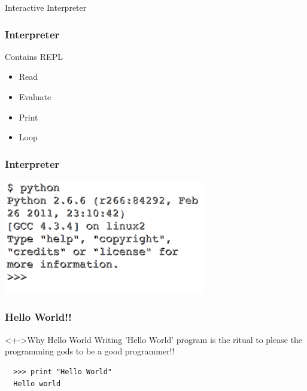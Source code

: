 \documentclass{beamer}
\begin{document}
\begin{frame}
 \begin{alertblock}{}
  \begin{center}
     Interactive Interpreter
  \end{center}
 \end{alertblock}

\end{frame}

\begin{frame}
 \frametitle{Interpreter}
  \begin{block}{Contains REPL}
  \begin{itemize}
   \item Read
   \item Evaluate
   \item Print
   \item Loop
  \end{itemize}

   
  \end{block}

\end{frame}

\begin{frame}
 \frametitle{Interpreter}
 \includegraphics[height=5cm]{Inter.png}
\end{frame}

\begin{frame}[fragile]
 \frametitle{Hello World!!}
 \begin{block}<+->{Why Hello World}
  Writing 'Hello World' program is the ritual to please the programming gods to be a good programmer!!
 \end{block}
 
\begin{verbatim}
  >>> print "Hello World"
  Hello world
\end{verbatim}

\end{frame}
\end{document}
